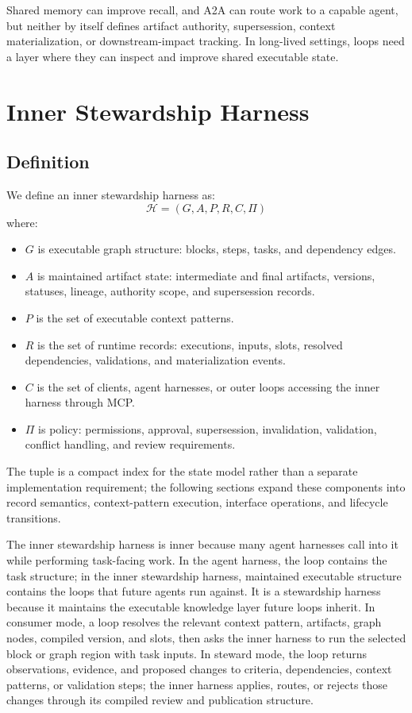 \documentclass{article}
\begin{document}
Shared memory can improve recall, and A2A can route work to a capable agent, but neither by itself defines artifact authority, supersession, context materialization, or downstream-impact tracking. In long-lived settings, loops need a layer where they can inspect and improve shared executable state.

\section{Inner Stewardship Harness}

\subsection{Definition}

We define an inner stewardship harness as:
\begin{equation}
\mathcal{H} = (G, A, P, R, C, \Pi)
\end{equation}
where:
\begin{itemize}[leftmargin=*]
\item $G$ is executable graph structure: blocks, steps, tasks, and dependency edges.
\item $A$ is maintained artifact state: intermediate and final artifacts, versions, statuses, lineage, authority scope, and supersession records.
\item $P$ is the set of executable context patterns.
\item $R$ is the set of runtime records: executions, inputs, slots, resolved dependencies, validations, and materialization events.
\item $C$ is the set of clients, agent harnesses, or outer loops accessing the inner harness through MCP.
\item $\Pi$ is policy: permissions, approval, supersession, invalidation, validation, conflict handling, and review requirements.
\end{itemize}
The tuple is a compact index for the state model rather than a separate implementation requirement; the following sections expand these components into record semantics, context-pattern execution, interface operations, and lifecycle transitions.

The inner stewardship harness is inner because many agent harnesses call into it while performing task-facing work. In the agent harness, the loop contains the task structure; in the inner stewardship harness, maintained executable structure contains the loops that future agents run against. It is a stewardship harness because it maintains the executable knowledge layer future loops inherit. In consumer mode, a loop resolves the relevant context pattern, artifacts, graph nodes, compiled version, and slots, then asks the inner harness to run the selected block or graph region with task inputs. In steward mode, the loop returns observations, evidence, and proposed changes to criteria, dependencies, context patterns, or validation steps; the inner harness applies, routes, or rejects those changes through its compiled review and publication structure.
\end{document}
